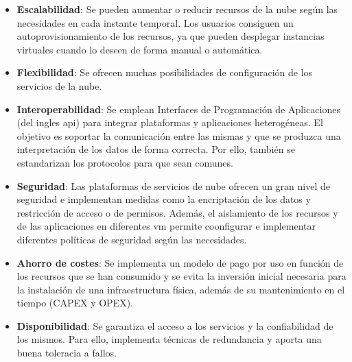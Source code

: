 \begin{itemize}
  \item \textbf{Escalabilidad}: Se pueden aumentar o reducir recursos de la nube según las necesidades en cada instante temporal. Los usuarios consiguen un autoprovisionamiento de los recursos, ya que pueden desplegar instancias virtuales cuando lo deseen de forma manual o automática.
  \item \textbf{Flexibilidad}: Se ofrecen muchas posibilidades de configuración de los servicios de la nube.
  \item \textbf{Interoperabilidad}: Se emplean Interfaces de Programación de Aplicaciones (del ingles \gls{api}) para integrar plataformas y aplicaciones heterogéneas. El objetivo es soportar la comunicación entre las mismas y que se produzca una interpretación de los datos de forma correcta. Por ello, también se estandarizan los protocolos para que sean comunes. 
  \item \textbf{Seguridad}: Las plataformas de servicios de nube ofrecen un gran nivel de seguridad e implementan medidas como la encriptación de los datos y restricción de acceso o de permisos. Además, el aislamiento de los recursos y de las aplicaciones en diferentes \gls{vm} permite coonfigurar e implementar diferentes políticas de seguridad según las necesidades.
  \item \textbf{Ahorro de costes}: Se implementa un modelo de pago por uso en función de los recursos que se han consumido y se evita la inversión inicial necesaria para la instalación de una infraestructura física, además de su mantenimiento en el tiempo (CAPEX y OPEX).
  \item \textbf{Disponibilidad}: Se garantiza el acceso a los servicios y la confiabilidad de los mismos. Para ello, implementa técnicas de redundancia y aporta una buena toleracia a fallos.
\end{itemize}









\vspace{3mm}













